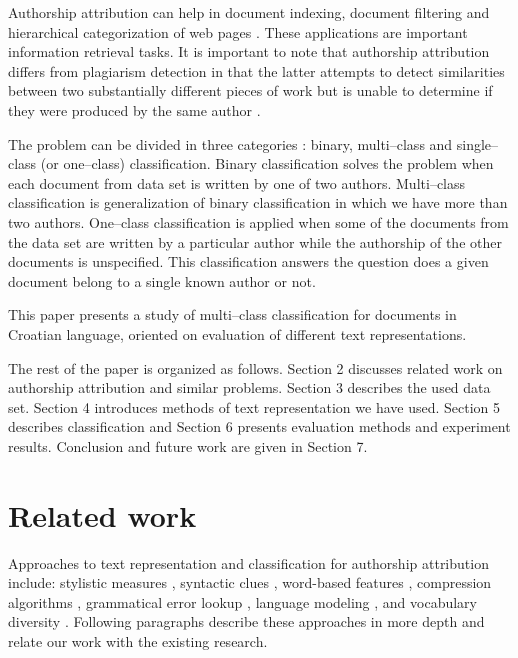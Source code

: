 \documentclass[11pt,english]{article}
\begin{document}
\begin{multicols}{2}
Authorship attribution can help in document indexing, document filtering and
hierarchical categorization of web pages \citep{luyckx2005shallow}. These applications are important information retrieval tasks. It is important to note that authorship attribution differs from plagiarism detection in that the latter attempts to detect similarities between two substantially different pieces of work but is unable to determine if they were produced by the same author \citep{de2001mining}.

The problem can be divided in three categories \citep{zhao2005effective}: binary,
multi--class and single--class (or one--class) classification. Binary
classification solves the problem when each document from data set is written by
one of two authors. Multi--class classification is generalization of binary
classification in which we have more than two authors. One--class
classification is applied when some of the documents from the data set are written by
a particular author while the authorship of the other documents is unspecified.
This classification answers the question does a given document belong to
a single known author or not.

This paper presents a study of multi--class classification for
documents in Croatian language, oriented on evaluation of different text representations.

The rest of the paper is organized as follows. Section 2 discusses related
work on authorship attribution and similar problems. Section 3 describes the used data set. Section 4 introduces methods of text representation we have used. Section 5 describes classification and Section 6 presents evaluation methods and experiment results. Conclusion and future work are given in Section 7.

\section{Related work}
Approaches to text representation and classification for authorship attribution include: stylistic measures \citep{coyotl2006authorship}, syntactic clues \citep{stamatatos2001computer,uzuner2005comparative}, word-based features \citep{argamon2005measuring,uzuner2005comparative}, compression algorithms \citep{kukushkina2001using,zhao2005effective}, grammatical error lookup \citep{koppel2003exploiting}, language modeling \citep{peng2003language,coyotl2006authorship}, and vocabulary diversity \citep{stamatatos2001computer}. Following paragraphs describe these approaches in more depth and relate our work with the existing research.


\end{multicols}
\end{document}
